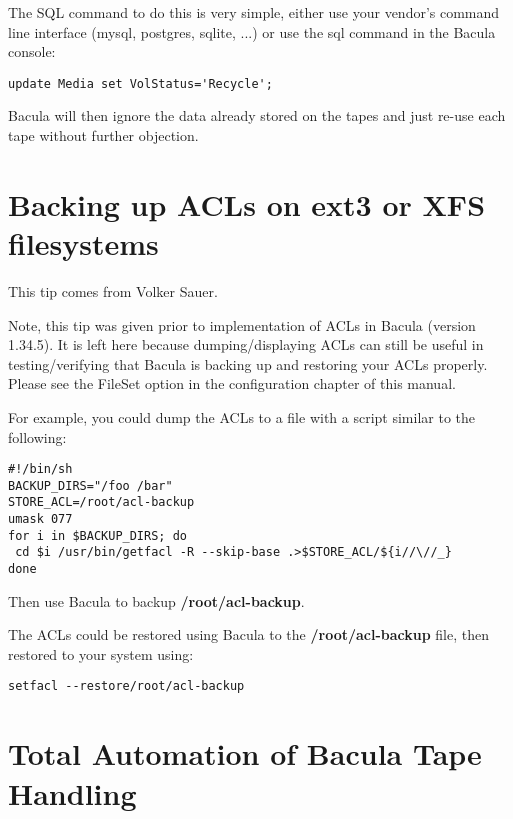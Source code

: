 The SQL command to do this is very simple, either use your vendor's
command line interface (mysql, postgres, sqlite, ...) or use the sql
command in the Bacula console:

\footnotesize
\begin{verbatim}
update Media set VolStatus='Recycle';
\end{verbatim}
\normalsize

Bacula will then ignore the data already stored on the tapes and just re-use
each tape without further objection. 

\section{Backing up ACLs on ext3 or XFS filesystems}
\label{ACLs}

This tip comes from Volker Sauer. 

Note, this tip was given prior to implementation of ACLs in Bacula (version
1.34.5). It is left here because dumping/displaying ACLs can still be useful
in testing/verifying that Bacula is backing up and restoring your ACLs
properly. Please see the 
 FileSet option in the
configuration chapter of this manual. 

For example, you could dump the ACLs to a file with a script similar to the
following: 

\footnotesize
\begin{verbatim}
#!/bin/sh
BACKUP_DIRS="/foo /bar"
STORE_ACL=/root/acl-backup
umask 077
for i in $BACKUP_DIRS; do
 cd $i /usr/bin/getfacl -R --skip-base .>$STORE_ACL/${i//\//_}
done
\end{verbatim}
\normalsize

Then use Bacula to backup {\bf /root/acl-backup}. 

The ACLs could be restored using Bacula to the {\bf /root/acl-backup} file,
then restored to your system using: 

\footnotesize
\begin{verbatim}
setfacl --restore/root/acl-backup
\end{verbatim}
\normalsize

\section{Total Automation of Bacula Tape Handling}
\label{automate}

